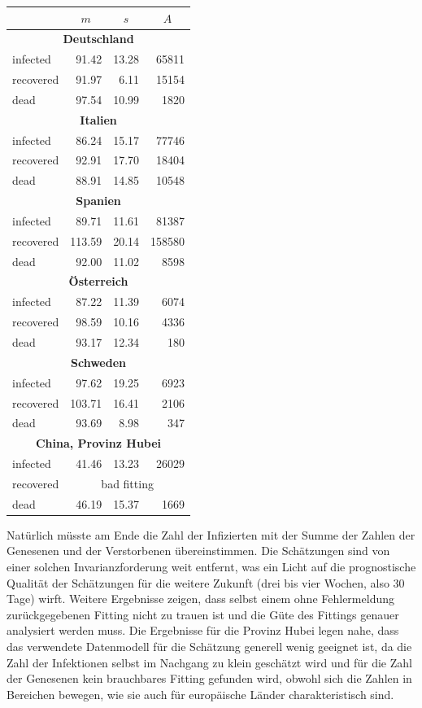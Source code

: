\documentclass[a4paper,11pt]{article}
\begin{document}
\begin{center}
  \begin{tabular}{|l|r|r|r|}\hline
    & \multicolumn{1}{|c|}{$m$} & \multicolumn{1}{|c|}{$s$}
    & \multicolumn{1}{|c|}{$A$} \\\hline
    \multicolumn{4}{|c|}{\bf Deutschland}\\\hline
    infected   & 91.42 & 13.28 &  65811\\
    recovered  & 91.97 &  6.11 &  15154\\
    dead       & 97.54 & 10.99 &   1820\\\hline
    \multicolumn{4}{|c|}{\bf Italien}\\\hline
    infected   & 86.24 & 15.17 &  77746\\
    recovered  & 92.91 & 17.70 &  18404\\
    dead       & 88.91 & 14.85 &  10548\\\hline
    \multicolumn{4}{|c|}{\bf Spanien}\\\hline
    infected   & 89.71 & 11.61 &  81387\\
    recovered  &113.59 & 20.14 & 158580\\
    dead       & 92.00 & 11.02 &   8598\\\hline
    \multicolumn{4}{|c|}{\bf Österreich}\\\hline
    infected   & 87.22 & 11.39 &   6074\\
    recovered  & 98.59 & 10.16 &   4336\\
    dead       & 93.17 & 12.34 &    180\\\hline
    \multicolumn{4}{|c|}{\bf Schweden}\\\hline
    infected   & 97.62 & 19.25 &   6923\\
    recovered  &103.71 & 16.41 &   2106\\
    dead       & 93.69 &  8.98 &    347\\\hline
    \multicolumn{4}{|c|}{\bf China, Provinz Hubei}\\\hline
    infected   & 41.46 & 13.23 &  26029\\
    recovered  & \multicolumn{3}{|c|}{bad fitting}\\
    dead       & 46.19 & 15.37 &   1669\\\hline
  \end{tabular}
\end{center}
Natürlich müsste am Ende die Zahl der Infizierten mit der Summe der Zahlen der
Genesenen und der Verstorbenen übereinstimmen.  Die Schätzungen sind von einer
solchen Invarianzforderung weit entfernt, was ein Licht auf die prognostische
Qualität der Schätzungen für die weitere Zukunft (drei bis vier Wochen, also
30 Tage) wirft.  Weitere Ergebnisse zeigen, dass selbst einem ohne
Fehlermeldung zurückgegebenen Fitting nicht zu trauen ist und die Güte des
Fittings genauer analysiert werden muss.  Die Ergebnisse für die Provinz Hubei
legen nahe, dass das verwendete Datenmodell für die Schätzung generell wenig
geeignet ist, da die Zahl der Infektionen selbst im Nachgang zu klein
geschätzt wird und für die Zahl der Genesenen kein brauchbares Fitting
gefunden wird, obwohl sich die Zahlen in Bereichen bewegen, wie sie auch für
europäische Länder charakteristisch sind.
\end{document}
